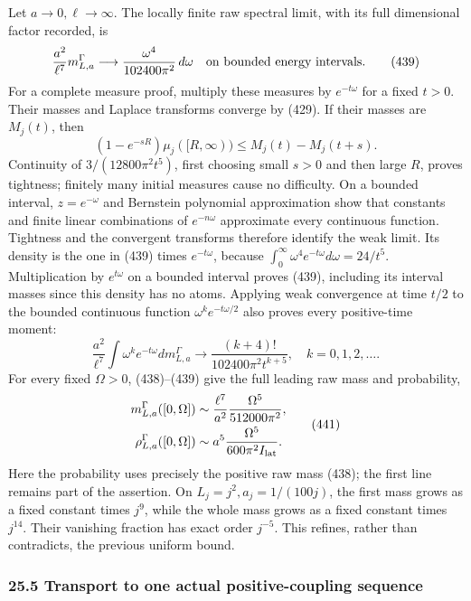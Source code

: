 \documentclass[
  11pt,
]{article}
\begin{document}
Let \(a\to0,\ell\to\infty\). The locally finite raw spectral limit, with
its full dimensional factor recorded, is \[
 \frac{a^2}{\ell^7}m^\Gamma_{L,a}
      \longrightarrow \frac{\omega^4}{102400\pi^2}\,d\omega
 \quad\hbox{on bounded energy intervals}.
 \tag{439}
\] For a complete measure proof, multiply these measures by
\(e^{-t\omega}\) for a fixed \(t>0\). Their masses and Laplace
transforms converge by (429). If their masses are \(M_j(t)\), then \[
 (1-e^{-sR})\mu_j([R,\infty))
       \le M_j(t)-M_j(t+s).
\] Continuity of \(3/(12800\pi^2t^5)\), first choosing small \(s>0\) and
then large \(R\), proves tightness; finitely many initial measures cause
no difficulty. On a bounded interval, \(z=e^{-\omega}\) and Bernstein
polynomial approximation show that constants and finite linear
combinations of \(e^{-n\omega}\) approximate every continuous function.
Tightness and the convergent transforms therefore identify the weak
limit. Its density is the one in (439) times \(e^{-t\omega}\), because
\(\int_0^\infty\omega^4e^{-t\omega}d\omega=24/t^5\). Multiplication by
\(e^{t\omega}\) on a bounded interval proves (439), including its
interval masses since this density has no atoms. Applying weak
convergence at time \(t/2\) to the bounded continuous function
\(\omega^k e^{-t\omega/2}\) also proves every positive-time moment: \[
 \frac{a^2}{\ell^7}\int\omega^k e^{-t\omega}dm^\Gamma_{L,a}
       \longrightarrow
         \frac{(k+4)!}{102400\pi^2t^{k+5}},
                  \quad k=0,1,2,\ldots .
 \tag{440}
\] For every fixed \(\Omega>0\), (438)--(439) give the full leading raw
mass and probability, \[
 \begin{split}
 m^\Gamma_{L,a}([0,\Omega])
       &\sim\frac{\ell^7}{a^2}\frac{\Omega^5}{512000\pi^2},\\
 \rho^\Gamma_{L,a}([0,\Omega])
       &\sim a^5\frac{\Omega^5}{600\pi^2 I_{\rm lat}} .
 \end{split}\tag{441}
\] Here the probability uses precisely the positive raw mass (438); the
first line remains part of the assertion. On \(L_j=j^2,a_j=1/(100j)\),
the first mass grows as a fixed constant times \(j^9\), while the whole
mass grows as a fixed constant times \(j^{14}\). Their vanishing
fraction has exact order \(j^{-5}\). This refines, rather than
contradicts, the previous uniform bound.

\subsubsection{25.5 Transport to one actual positive-coupling
sequence}\label{transport-to-one-actual-positive-coupling-sequence}
\end{document}
